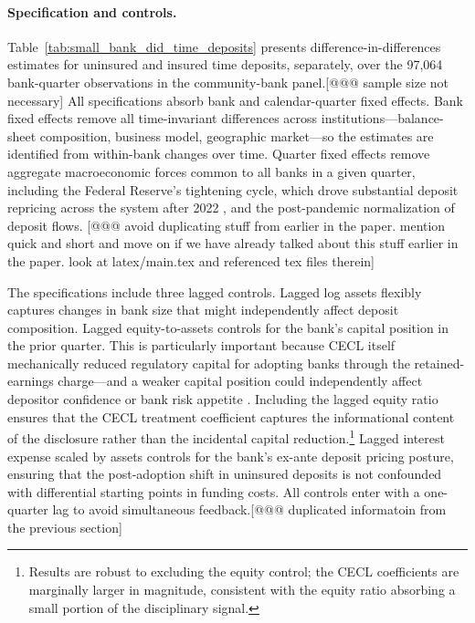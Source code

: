 \paragraph{Specification and controls.}
Table~\ref{tab:small_bank_did_time_deposits} presents difference-in-differences
estimates for uninsured and insured time deposits, separately, over the 97,064
bank-quarter observations in the community-bank panel.[@@@ sample size not necessary]  All specifications absorb
bank and calendar-quarter fixed effects.  Bank fixed effects remove all
time-invariant differences across institutions---balance-sheet composition,
business model, geographic market---so the estimates are identified from
within-bank changes over time.  Quarter fixed effects remove aggregate
macroeconomic forces common to all banks in a given quarter, including the Federal
Reserve's tightening cycle, which drove substantial deposit repricing across the
system after 2022 \citep{drechsler2017deposits}, and the post-pandemic
normalization of deposit flows. [@@@ avoid duplicating stuff from earlier in the paper. mention quick and short and move on if we have already talked about this stuff earlier in the paper. look at latex/main.tex and referenced tex files therein]

The specifications include three lagged controls.  Lagged log assets flexibly
captures changes in bank size that might independently affect deposit composition.
Lagged equity-to-assets controls for the bank's capital position in the prior
quarter.  This is particularly important because CECL itself mechanically reduced
regulatory capital for adopting banks through the retained-earnings charge---and
a weaker capital position could independently affect depositor confidence or bank
risk appetite \citep{bushman2015delayed}.  Including the lagged equity ratio
ensures that the CECL treatment coefficient captures the informational content of
the disclosure rather than the incidental capital reduction.\footnote{Results are
robust to excluding the equity control; the CECL coefficients are marginally
larger in magnitude, consistent with the equity ratio absorbing a small portion of
the disciplinary signal.}  Lagged interest expense scaled by assets controls for
the bank's ex-ante deposit pricing posture, ensuring that the post-adoption shift
in uninsured deposits is not confounded with differential starting points in
funding costs.  All controls enter with a one-quarter lag to avoid simultaneous
feedback.[@@@ duplicated informatoin from the previous section]

